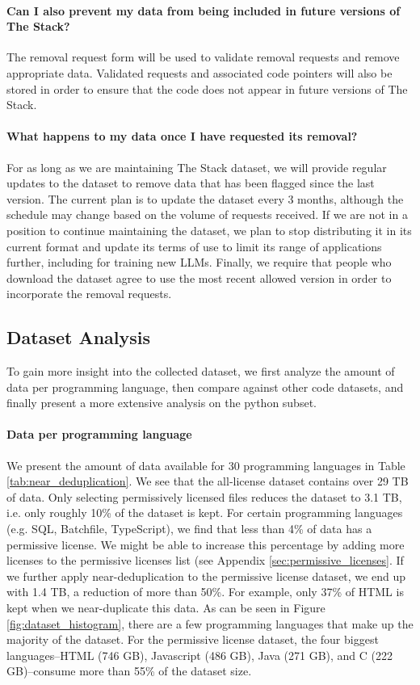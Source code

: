 \paragraph{Can I also prevent my data from being included in future versions of The Stack?} The removal request form will be used to validate removal requests and remove appropriate data. Validated requests and associated code pointers will also be stored in order to ensure that the code does not appear in future versions of The Stack.

\paragraph{What happens to my data once I have requested its removal?} For as long as we are maintaining The Stack dataset, we will provide regular updates to the dataset to remove data that has been flagged since the last version. The current plan is to update the dataset every 3 months, although the schedule may change based on the volume of requests received. If we are not in a position to continue maintaining the dataset, we plan to stop distributing it in its current format and update its terms of use to limit its range of applications further, including for training new LLMs. Finally, we require that people who download the dataset agree to use the most recent allowed version in order to incorporate the removal requests.

\subsection{Dataset Analysis}\label{sec:dataset_analysis}
To gain more insight into the collected dataset, we first analyze the amount of data per programming language, then compare against other code datasets, and finally present a more extensive analysis on the python subset. 

\paragraph{Data per programming language} We present the amount of data available for 30 programming languages in Table \ref{tab:near_deduplication}. We see that the all-license dataset contains over 29 TB of data. Only selecting permissively licensed files reduces the dataset to 3.1 TB, i.e. only roughly 10\% of the dataset is kept.  For certain programming languages (e.g. SQL, Batchfile, TypeScript), we find that less than 4\% of data has a permissive license. We might be able to increase this percentage by adding more licenses to the permissive licenses list (see Appendix \ref{sec:permissive_licenses}. If we further apply near-deduplication to the permissive license dataset, we end up with 1.4 TB, a reduction of more than 50\%. For example, only 37\% of HTML is kept when we near-duplicate this data. As can be seen in Figure \ref{fig:dataset_histogram}, there are a few programming languages that make up the majority of the dataset. For the permissive license dataset, the four biggest languages--HTML (746 GB), Javascript (486 GB), Java (271 GB), and C (222 GB)--consume more than 55\% of the dataset size.

